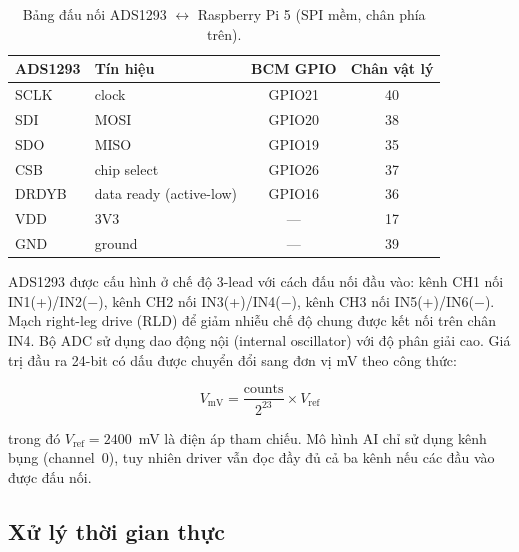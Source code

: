 \documentclass[../DoAn.tex]{subfiles}
\begin{document}
\begin{table}[htbp]
  \centering
  \caption{Bảng đấu nối ADS1293 $\leftrightarrow$ Raspberry Pi 5 (SPI mềm, chân phía trên).}
  \label{tab:ads1293_wiring}
  \begin{tabular}{|l|l|c|c|}
    \hline
    \textbf{ADS1293} & \textbf{Tín hiệu} & \textbf{BCM GPIO} & \textbf{Chân vật lý} \\\hline
    SCLK  & clock                 & GPIO21 & 40 \\\hline
    SDI   & MOSI                  & GPIO20 & 38 \\\hline
    SDO   & MISO                  & GPIO19 & 35 \\\hline
    CSB   & chip select           & GPIO26 & 37 \\\hline
    DRDYB & data ready (active-low) & GPIO16 & 36 \\\hline
    VDD   & 3V3                   & ---    & 17 \\\hline
    GND   & ground                & ---    & 39 \\\hline
  \end{tabular}
\end{table}

ADS1293 được cấu hình ở chế độ 3-lead với cách đấu nối đầu vào: kênh CH1 nối IN1(+)/IN2($-$), kênh CH2 nối IN3(+)/IN4($-$), kênh CH3 nối IN5(+)/IN6($-$). Mạch right-leg drive (RLD) để giảm nhiễu chế độ chung được kết nối trên chân IN4. Bộ ADC sử dụng dao động nội (internal oscillator) với độ phân giải cao. Giá trị đầu ra 24-bit có dấu được chuyển đổi sang đơn vị mV theo công thức:

\begin{equation}
  V_{\mathrm{mV}} = \frac{\text{counts}}{2^{23}} \times V_{\mathrm{ref}}
\end{equation}

\noindent trong đó $V_{\mathrm{ref}} = 2400$~mV là điện áp tham chiếu. Mô hình AI chỉ sử dụng kênh bụng (channel~0), tuy nhiên driver vẫn đọc đầy đủ cả ba kênh nếu các đầu vào được đấu nối.

\subsection{Xử lý thời gian thực}
\end{document}
